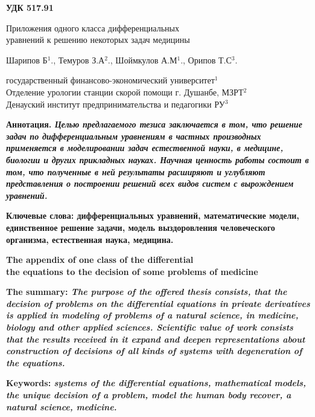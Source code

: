 \documentclass[11pt, a4paper]{article}
\begin{document}
	\Large
	
	\bf УДК 517.91 \\
	\begin{center}
		Приложения одного класса дифференциальных\\
		уравнений к решению некоторых задач медицины
		\vspace{0.5cm}
		
		\rm Шарипов Б$^1$., Темуров З.А$^2$., Шоймкулов А.М$^1$., Орипов Т.С$^3$.
		\vspace{0.5cm}
		
		 государственный финансово-экономический университет$^1$\\
		Отделение урологии станции скорой помощи г. Душанбе, МЗРТ$^2$\\
		Денауский институт предпринимательства и педагогики РУ$^3$
		\vspace{0.5cm}
	\end{center}
	
	\bf Аннотация. \it Целью предлагаемого тезиса заключается в том, что решение задач по дифференциальным уравнениям в частных производных применяется в моделировании задач естественной науки, в медицине, биологии и других прикладных науках. Научная ценность работы состоит в том, что полученные в ней результаты расширяют и углубляют представления о построении   решений всех видов систем с вырождением уравнений.
	
	\bf Ключевые слова:  дифференциальных уравнений, математические модели, единственное решение задачи, модель выздоровления человеческого организма, естественная наука, медицина.
	
	\begin{center}
		\bf The appendix of one class of the differential\\
		the equations to the decision of some problems of medicine
	\end{center}
	
	\bf The summary: \it The purpose of the offered thesis consists, that the decision of problems on the differential equations in private derivatives is applied in modeling of problems of a natural science, in medicine, biology and other applied sciences. Scientific value of work consists that the results received in it expand and deepen representations about construction of decisions of all kinds of systems with degeneration of the equations.
	
	\bf Keywords: \it systems of the differential equations, mathematical models, the unique decision of a problem, model the human body recover, a natural science, medicine.
	
\end{document}
